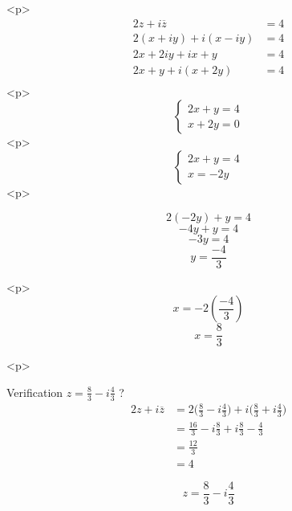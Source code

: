 <p>
$$\begin{aligned}
2z +i\overline{z} &= 4\\
2(x+iy) + i(x-iy) &= 4\\
2x +2iy +ix +y &= 4\\
2x +y +i (x + 2y) &= 4\\
\end{aligned}$$
<p>
$$
\begin{cases}
2x +y = 4\\
x + 2y = 0
\end{cases}
$$
<p>
$$
\begin{cases}
2x +y = 4\\
x = - 2y 
\end{cases}
$$
<p>


$$ 2(-2y) + y = 4 $$
$$ -4y +y = 4 $$
$$ -3y = 4$$
$$ \boxed{y = \frac{-4}{3}}$$

<p>
$$ x = -2(\frac{-4}{3})$$
$$\boxed{ x = \frac{8}{3}} $$

<p>

Verification $ z = \frac{8}{3}-i\frac{4}{3} $ ?
$$\begin{aligned}
 2z +i\overline{z} &= 2\bigg(\frac{8}{3}-i\frac{4}{3}\bigg)  + i \bigg(\frac{8}{3}+i\frac{4}{3}\bigg) \\
 &= \frac{16}{3}-i\frac{8}{3}  + i\frac{8}{3}-\frac{4}{3} \\
 &= \frac{12}{3}\\
 &= 4

\end{aligned}$$

$$ \boxed{z = \frac{8}{3}-i\frac{4}{3}} $$

